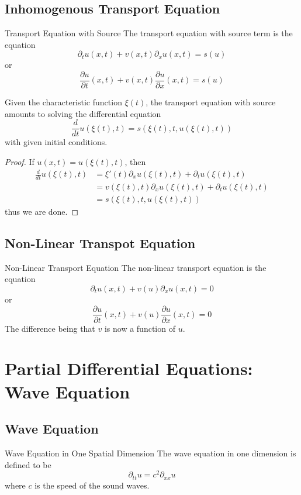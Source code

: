 \documentclass[a4paper]{article}
\begin{document}
\subsection{Inhomogenous Transport Equation}
\begin{defn}{Transport Equation with Source}{} The transport equation with source term is the equation $$\partial_tu(x,t)+v(x,t)\partial_xu(x,t)=s(u)$$ or $$\frac{\partial u}{\partial t}(x,t)+v(x,t)\frac{\partial u}{\partial x}(x,t)=s(u)$$
\end{defn}

\begin{prp}{}{} Given the characteristic function $\xi(t)$, the transport equation with source amounts to solving the differential equation $$\frac{d}{dt}u(\xi(t),t)=s(\xi(t),t,u(\xi(t),t))$$ with given initial conditions. \tcbline
\begin{proof}
If $u(x,t)=u(\xi(t),t)$, then 
\begin{align*}
\frac{d}{dt}u(\xi(t),t)&=\xi'(t)\partial_xu(\xi(t),t)+\partial_tu(\xi(t),t)\\
&=v(\xi(t),t)\partial_xu(\xi(t),t)+\partial_tu(\xi(t),t)\\
&=s(\xi(t),t,u(\xi(t),t))
\end{align*}
thus we are done. 
\end{proof}
\end{prp}

\subsection{Non-Linear Transpot Equation}
\begin{defn}{Non-Linear Transport Equation}{} The non-linear transport equation is the equation $$\partial_tu(x,t)+v(u)\partial_xu(x,t)=0$$ or $$\frac{\partial u}{\partial t}(x,t)+v(u)\frac{\partial u}{\partial x}(x,t)=0$$ The difference being that $v$ is now a function of $u$. 
\end{defn}

\pagebreak
\section{Partial Differential Equations: Wave Equation}
\subsection{Wave Equation}
\begin{defn}{Wave Equation in One Spatial Dimension}{} The wave equation in one dimension is defined to be $$\partial_{tt}u=c^2\partial_{xx}u$$ where $c$ is the speed of the sound waves. 
\end{defn}
\end{document}
